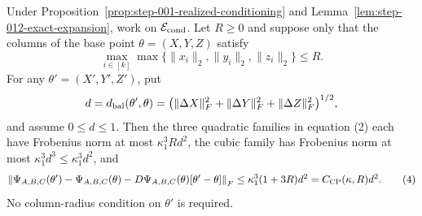 \begin{proposition}
\label{prop:step-012-raw-remainder}
Under Proposition~\ref{prop:step-001-realized-conditioning} and
Lemma~\ref{lem:step-012-exact-expansion}, work on
\(\mathcal E_{\rm cond}\). Let \(R\ge0\) and suppose only that the columns
of the base point \(\theta=(X,Y,Z)\) satisfy
\[
  \max_{i\in[k]}
  \max\{\|x_i\|_2,\|y_i\|_2,\|z_i\|_2\}\le R.             \tag{3}
\]
For any \(\theta'=(X',Y',Z')\), put
\[
  d=d_{\rm bal}(\theta',\theta)
   =\bigl(\|\Delta X\|_F^2+\|\Delta Y\|_F^2
           +\|\Delta Z\|_F^2\bigr)^{1/2},
\]
and assume \(0\le d\le1\). Then the three quadratic families in equation
(2) each have Frobenius norm at most \(\kappa_1^3Rd^2\), the cubic family
has Frobenius norm at most \(\kappa_1^3d^3\le\kappa_1^3d^2\), and
\[
  \left\|\Psi_{A,B,C}(\theta')-\Psi_{A,B,C}(\theta)
  -D\Psi_{A,B,C}(\theta)[\theta'-\theta]\right\|_F
  \le \kappa_1^3(1+3R)d^2
  =C_{\rm CP}(\kappa,R)d^2.                               \tag{4}
\]
No column-radius condition on \(\theta'\) is required.

\end{proposition}

